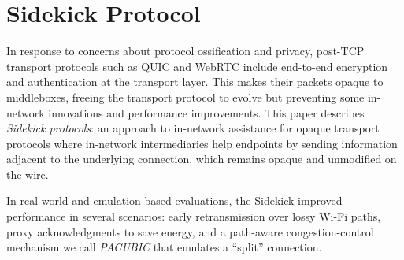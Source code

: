 \chapter{Sidekick Protocol}
\label{sec:sidekick}

In response to concerns about protocol ossification and privacy, post-TCP
transport protocols such as QUIC and Web\-RTC include end-to-end encryption and
authentication at the transport layer. This makes their packets opaque to
middleboxes, freeing the transport protocol to evolve but preventing some
in-network innovations and performance improvements. This paper describes
\emph{Sidekick protocols}: an approach to in-network assistance for opaque
transport protocols where in-network intermediaries help endpoints by sending
information adjacent to the underlying connection, which remains opaque and
unmodified on the wire.

In real-world and emulation-based evaluations, the Sidekick improved performance
in several scenarios: early retransmission over lossy Wi-Fi paths, proxy
acknowledgments to save energy, and a path-aware congestion-control mechanism
we call \emph{PACUBIC} that emulates a ``split'' connection.







